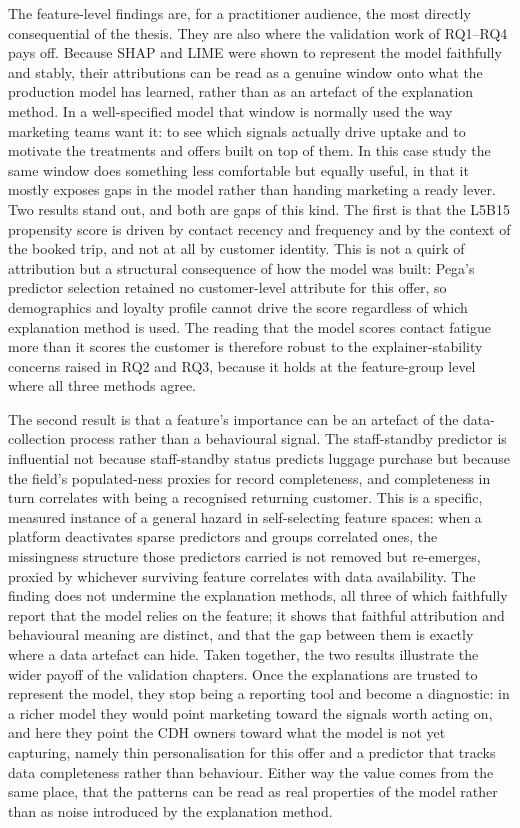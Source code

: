 \documentclass[oneside]{memoir} %
\begin{document}
The feature-level findings are, for a practitioner audience, the most directly consequential of the thesis. They are also where the validation work of RQ1--RQ4 pays off. Because SHAP and LIME were shown to represent the model faithfully and stably, their attributions can be read as a genuine window onto what the production model has learned, rather than as an artefact of the explanation method. In a well-specified model that window is normally used the way marketing teams want it: to see which signals actually drive uptake and to motivate the treatments and offers built on top of them. In this case study the same window does something less comfortable but equally useful, in that it mostly exposes gaps in the model rather than handing marketing a ready lever. Two results stand out, and both are gaps of this kind. The first is that the L5B15 propensity score is driven by contact recency and frequency and by the context of the booked trip, and not at all by customer identity. This is not a quirk of attribution but a structural consequence of how the model was built: Pega's predictor selection retained no customer-level attribute for this offer, so demographics and loyalty profile cannot drive the score regardless of which explanation method is used. The reading that the model scores contact fatigue more than it scores the customer is therefore robust to the explainer-stability concerns raised in RQ2 and RQ3, because it holds at the feature-group level where all three methods agree.

The second result is that a feature's importance can be an artefact of the data-collection process rather than a behavioural signal. The staff-standby predictor is influential not because staff-standby status predicts luggage purchase but because the field's populated-ness proxies for record completeness, and completeness in turn correlates with being a recognised returning customer. This is a specific, measured instance of a general hazard in self-selecting feature spaces: when a platform deactivates sparse predictors and groups correlated ones, the missingness structure those predictors carried is not removed but re-emerges, proxied by whichever surviving feature correlates with data availability. The finding does not undermine the explanation methods, all three of which faithfully report that the model relies on the feature; it shows that faithful attribution and behavioural meaning are distinct, and that the gap between them is exactly where a data artefact can hide. Taken together, the two results illustrate the wider payoff of the validation chapters. Once the explanations are trusted to represent the model, they stop being a reporting tool and become a diagnostic: in a richer model they would point marketing toward the signals worth acting on, and here they point the CDH owners toward what the model is not yet capturing, namely thin personalisation for this offer and a predictor that tracks data completeness rather than behaviour. Either way the value comes from the same place, that the patterns can be read as real properties of the model rather than as noise introduced by the explanation method.
\end{document}
